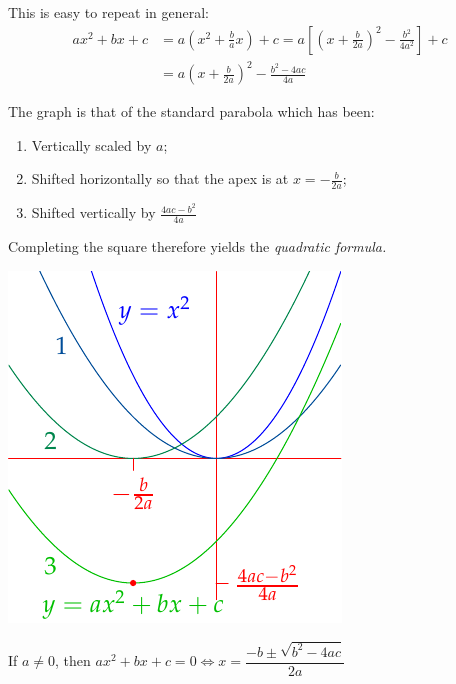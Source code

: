 This is easy to repeat in general:
\begin{align*}
ax^2+bx+c&=a\left(x^2+\frac bax\right)+c =a\left[\left(x+\frac b{2a}\right)^2-\frac{b^2}{4a^2}\right]+c\\
&=a\left(x+\frac b{2a}\right)^2-\frac{b^2-4ac}{4a}
\end{align*}
\begin{minipage}[t]{0.6\linewidth}\vspace{0pt}
The graph is that of the standard parabola which has been:
\begin{enumerate}\itemsep0pt
  \item Vertically scaled by $a$;
  \item Shifted horizontally so that the apex is at $x=-\frac b{2a}$;
  \item Shifted vertically by $\frac{4ac-b^2}{4a}$
\end{enumerate}
Completing the square therefore yields the \emph{quadratic formula.}
\end{minipage}\begin{minipage}[t]{0.4\linewidth}\vspace{-60pt}
\flushright\includegraphics[scale=0.9]{poly-quad}
\end{minipage}

\begin{thm}{}{}
If $a\neq 0$, then $ax^2+bx+c=0\iff x=\dfrac{-b\pm\sqrt{b^2-4ac}}{2a}$
\end{thm}

\goodbreak

